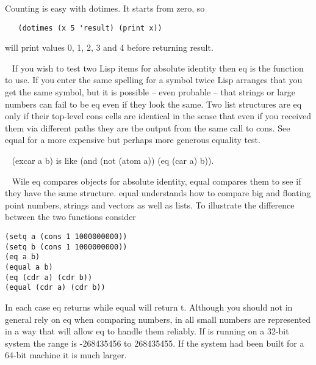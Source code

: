 \begin{description}
Counting is easy with {\tx dotimes}. It starts from zero, so
{\small\begin{verbatim}
   (dotimes (x 5 'result) (print x))
\end{verbatim}}
\noindent will print values 0, 1, 2, 3 and 4 before returning {\tx result}.
\item[{\tx eq~~~~~~~~~~~} \hspace{1cm} {\em function 2 args}]~\newline
If you wish to test two Lisp items for absolute identity then {\tx eq} is the
function to use. If you enter the same spelling for a symbol twice Lisp arranges
that you get the same symbol, but it is possible -- even probable -- that strings
or large numbers can fail to be {\tx eq} even if they look the same. Two list
structures are {\tx eq} only if their top-level {\tx cons} cells are identical
in the sense that even if you received them via different paths they are the
output from the same call to {\tx cons}. See {\tx equal} for a more
expensive but perhaps more generous equality test.
\item[{\tx eqcar~~~~~~~~} \hspace{1cm} {\em function 2 args}]~\newline
{\tx (excar a b)} is like {\tx (and (not (atom a)) (eq (car a) b))}.
\item[{\tx equal~~~~~~~~} \hspace{1cm} {\em function 2 args}]~\newline
Wile {\tx eq} compares objects for absolute identity, {\tx equal} compares
them to see if they have the same structure. {\tx equal} understands how to
compare big and floating point numbers, strings and vectors as well as
lists. To illustrate the difference between the two functions consider
{\begin{verbatim}
(setq a (cons 1 1000000000))
(setq b (cons 1 1000000000))
(eq a b)
(equal a b)
(eq (cdr a) (cdr b))
(equal (cdr a) (cdr b))
\end{verbatim}}
In each case {\tx eq} returns \nil{} while {\tx equal} will return  {\tx t}.
Although you should not in general rely on {\tx eq} when comparing numbers,
in \vsl{} all small numbers are represented in a way that will allow {\tx eq}
to handle them reliably. If \vsl{} is running on a 32-bit system the
range is -268435456 to 268435455. If the system had been built for a 64-bit
machine it is much larger.
\item[{\tx error~~~~~~~~} \hspace{1cm} {\em function 2 args}]~\newline

\end{description}
